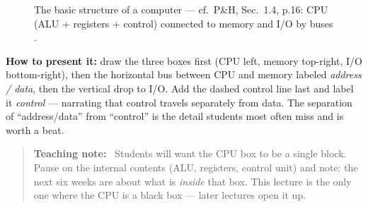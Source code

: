 \documentclass[11pt]{article}
\newenvironment{teachingaside}{\begin{quote}\small\color{primary-gold}\textbf{Teaching note:}\ }{\end{quote}}
\begin{document}
\begin{figure}[h]
  \centering
  \caption{The basic structure of a computer --- cf.\ P\&H, Sec.~1.4, p.16: CPU (ALU + registers + control) connected to memory and I/O by buses \cite{PattersonHennessy2017_computer_organization_design}.}
  \label{fig:basic-structure}
\end{figure}

\textbf{How to present it:} draw the three boxes first (CPU left, memory top-right, I/O bottom-right), then the horizontal bus between CPU and memory labeled \emph{address / data}, then the vertical drop to I/O. Add the dashed control line last and label it \emph{control} --- narrating that control travels separately from data. The separation of ``address/data'' from ``control'' is the detail students most often miss and is worth a beat.

\begin{teachingaside}
Students will want the CPU box to be a single block. Pause on the internal contents (ALU, registers, control unit) and note: the next six weeks are about what is \emph{inside} that box. This lecture is the only one where the CPU is a black box --- later lectures open it up.
\end{teachingaside}
\end{document}
